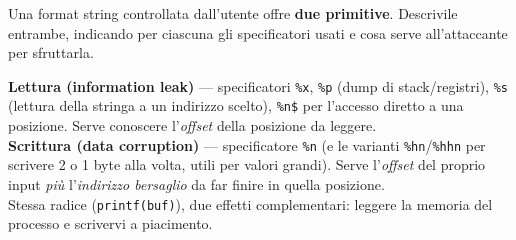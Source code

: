 \question[5]
Una format string controllata dall'utente offre \textbf{due primitive}. Descrivile entrambe, indicando per ciascuna gli specificatori usati e cosa serve all'attaccante per sfruttarla.
\begin{solution}
\textbf{Lettura (information leak)} --- specificatori \lstinline|%x|, \lstinline|%p| (dump di stack/registri), \lstinline|%s| (lettura della stringa a un indirizzo scelto), \lstinline|%n$| per l'accesso diretto a una posizione. Serve conoscere l'\emph{offset} della posizione da leggere.\\
\textbf{Scrittura (data corruption)} --- specificatore \lstinline|%n| (e le varianti \lstinline|%hn|/\lstinline|%hhn| per scrivere 2 o 1 byte alla volta, utili per valori grandi). Serve l'\emph{offset} del proprio input \emph{più} l'\emph{indirizzo bersaglio} da far finire in quella posizione.\\
Stessa radice (\lstinline|printf(buf)|), due effetti complementari: leggere la memoria del processo e scrivervi a piacimento.
\end{solution}
